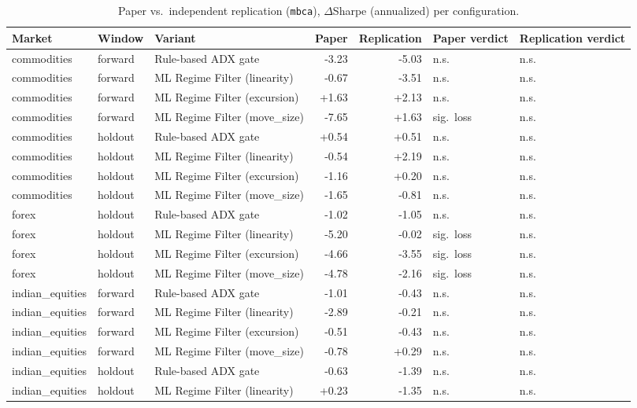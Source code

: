 \begin{longtable}{l l l r r l l}
\caption{Paper vs.\ independent replication (\texttt{mbca}), $\Delta$Sharpe (annualized) per configuration.} \label{tab:replication} \\
\toprule
Market & Window & Variant & Paper & Replication & Paper verdict & Replication verdict \\
\midrule
\endhead
\bottomrule
\endfoot
commodities & forward & Rule-based ADX gate & -3.23 & -5.03 & n.s. & n.s. \\
commodities & forward & ML Regime Filter (linearity) & -0.67 & -3.51 & n.s. & n.s. \\
commodities & forward & ML Regime Filter (excursion) & +1.63 & +2.13 & n.s. & n.s. \\
commodities & forward & ML Regime Filter (move\_size) & -7.65 & +1.63 & sig.\ loss & n.s. \\
commodities & holdout & Rule-based ADX gate & +0.54 & +0.51 & n.s. & n.s. \\
commodities & holdout & ML Regime Filter (linearity) & -0.54 & +2.19 & n.s. & n.s. \\
commodities & holdout & ML Regime Filter (excursion) & -1.16 & +0.20 & n.s. & n.s. \\
commodities & holdout & ML Regime Filter (move\_size) & -1.65 & -0.81 & n.s. & n.s. \\
forex & holdout & Rule-based ADX gate & -1.02 & -1.05 & n.s. & n.s. \\
forex & holdout & ML Regime Filter (linearity) & -5.20 & -0.02 & sig.\ loss & n.s. \\
forex & holdout & ML Regime Filter (excursion) & -4.66 & -3.55 & sig.\ loss & n.s. \\
forex & holdout & ML Regime Filter (move\_size) & -4.78 & -2.16 & sig.\ loss & n.s. \\
indian\_equities & forward & Rule-based ADX gate & -1.01 & -0.43 & n.s. & n.s. \\
indian\_equities & forward & ML Regime Filter (linearity) & -2.89 & -0.21 & n.s. & n.s. \\
indian\_equities & forward & ML Regime Filter (excursion) & -0.51 & -0.43 & n.s. & n.s. \\
indian\_equities & forward & ML Regime Filter (move\_size) & -0.78 & +0.29 & n.s. & n.s. \\
indian\_equities & holdout & Rule-based ADX gate & -0.63 & -1.39 & n.s. & n.s. \\
indian\_equities & holdout & ML Regime Filter (linearity) & +0.23 & -1.35 & n.s. & n.s. \\

\end{longtable}
